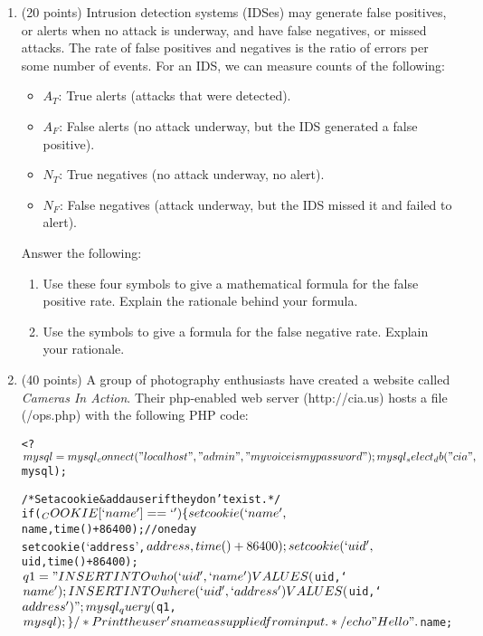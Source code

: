 \documentclass[letterpaper]{article}
\begin{document}
\begin{enumerate}

\item (20 points)
Intrusion detection systems (IDSes) may generate false positives, or alerts when no attack is underway, and have false negatives, or missed attacks. The rate of false positives and negatives is the ratio of errors per some number of events. For an IDS, we can measure counts of the following:
\begin{itemize}
\item $A_T$: True alerts (attacks that were detected).
\item $A_F$: False alerts (no attack underway, but the IDS generated a false positive).
\item $N_T$: True negatives (no attack underway, no alert).
\item $N_F$: False negatives (attack underway, but the IDS missed it and failed to alert).
\end{itemize}
Answer the following:
\begin{enumerate}
\item Use these four symbols to give a mathematical formula for the false positive rate. Explain the rationale behind your formula.
\item Use the symbols to give a formula for the false negative rate. Explain your rationale.
\end{enumerate}

\item (40 points)
A group of photography enthusiasts have created a website called {\em Cameras In Action}. Their php-enabled web server (http://cia.us) hosts a file (/ops.php) with the following PHP code:
\begin{alltt}
<? 
$mysql = mysql_connect("localhost", "admin", "myvoiceismypassword");
mysql_select_db("cia", $mysql);

/* Set a cookie \& add a user if they don't exist. */
if ($_COOKIE[`name'] == `') \{
  setcookie(`name', $name, time()+86400); // one day
  setcookie(`address', $address, time()+86400);
  setcookie(`uid', $uid, time()+86400);
  $q1 = "INSERT INTO who (`uid', `name') VALUES ($uid, `$name'); 
         INSERT INTO where (`uid', `address') VALUES ($uid, `$address')";
  mysql_query($q1, $mysql);
\}

/* Print the user's name as supplied from input. */
echo "Hello ".$name;


\end{alltt}
\end{enumerate}
\end{document}
